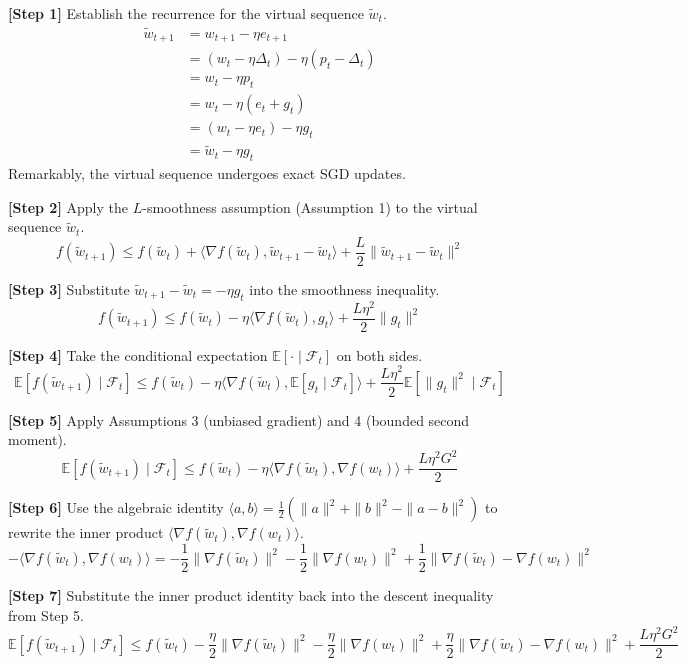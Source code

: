 \documentclass{article}
\begin{document}
\textbf{[Step 1]} Establish the recurrence for the virtual sequence $\tilde{w}_t$.
\begin{align*}
    \tilde{w}_{t+1} &= w_{t+1} - \eta e_{t+1} \\
    &= (w_t - \eta \Delta_t) - \eta (p_t - \Delta_t) \\
    &= w_t - \eta p_t \\
    &= w_t - \eta (e_t + g_t) \\
    &= (w_t - \eta e_t) - \eta g_t \\
    &= \tilde{w}_t - \eta g_t
\end{align*}
Remarkably, the virtual sequence undergoes exact SGD updates.

\textbf{[Step 2]} Apply the $L$-smoothness assumption (Assumption 1) to the virtual sequence $\tilde{w}_t$.
$$ f(\tilde{w}_{t+1}) \leq f(\tilde{w}_t) + \langle \nabla f(\tilde{w}_t), \tilde{w}_{t+1} - \tilde{w}_t \rangle + \frac{L}{2} \|\tilde{w}_{t+1} - \tilde{w}_t\|^2 $$

\textbf{[Step 3]} Substitute $\tilde{w}_{t+1} - \tilde{w}_t = -\eta g_t$ into the smoothness inequality.
$$ f(\tilde{w}_{t+1}) \leq f(\tilde{w}_t) - \eta \langle \nabla f(\tilde{w}_t), g_t \rangle + \frac{L\eta^2}{2} \|g_t\|^2 $$

\textbf{[Step 4]} Take the conditional expectation $\mathbb{E}[\cdot \mid \mathcal{F}_t]$ on both sides.
$$ \mathbb{E}[f(\tilde{w}_{t+1}) \mid \mathcal{F}_t] \leq f(\tilde{w}_t) - \eta \langle \nabla f(\tilde{w}_t), \mathbb{E}[g_t \mid \mathcal{F}_t] \rangle + \frac{L\eta^2}{2} \mathbb{E}[\|g_t\|^2 \mid \mathcal{F}_t] $$

\textbf{[Step 5]} Apply Assumptions 3 (unbiased gradient) and 4 (bounded second moment).
$$ \mathbb{E}[f(\tilde{w}_{t+1}) \mid \mathcal{F}_t] \leq f(\tilde{w}_t) - \eta \langle \nabla f(\tilde{w}_t), \nabla f(w_t) \rangle + \frac{L\eta^2 G^2}{2} $$

\textbf{[Step 6]} Use the algebraic identity $\langle a, b \rangle = \frac{1}{2}(\|a\|^2 + \|b\|^2 - \|a - b\|^2)$ to rewrite the inner product $\langle \nabla f(\tilde{w}_t), \nabla f(w_t) \rangle$.
$$ -\langle \nabla f(\tilde{w}_t), \nabla f(w_t) \rangle = -\frac{1}{2}\|\nabla f(\tilde{w}_t)\|^2 - \frac{1}{2}\|\nabla f(w_t)\|^2 + \frac{1}{2}\|\nabla f(\tilde{w}_t) - \nabla f(w_t)\|^2 $$

\textbf{[Step 7]} Substitute the inner product identity back into the descent inequality from Step 5.
$$ \mathbb{E}[f(\tilde{w}_{t+1}) \mid \mathcal{F}_t] \leq f(\tilde{w}_t) - \frac{\eta}{2}\|\nabla f(\tilde{w}_t)\|^2 - \frac{\eta}{2}\|\nabla f(w_t)\|^2 + \frac{\eta}{2}\|\nabla f(\tilde{w}_t) - \nabla f(w_t)\|^2 + \frac{L\eta^2 G^2}{2} $$
\end{document}
